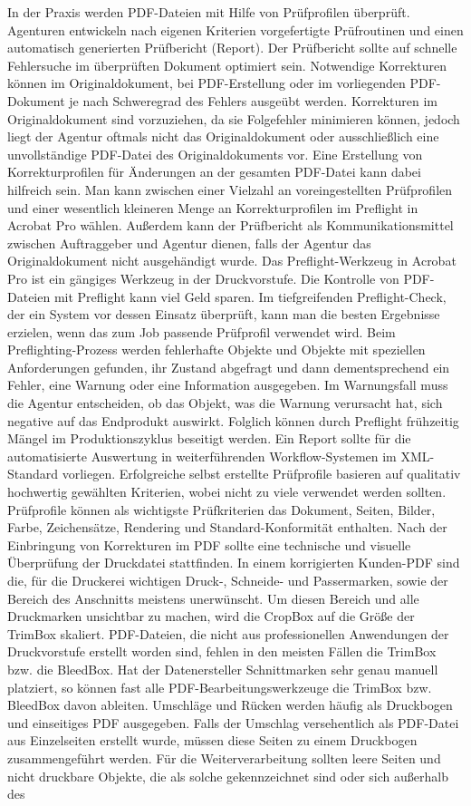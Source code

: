 In der Praxis werden PDF-Dateien mit Hilfe von Prüfprofilen überprüft. Agenturen entwickeln nach eigenen Kriterien vorgefertigte Prüfroutinen und einen automatisch generierten Prüfbericht (Report). Der Prüfbericht sollte auf schnelle Fehlersuche im überprüften Dokument optimiert sein. Notwendige Korrekturen können im Originaldokument, bei PDF-Erstellung oder im vorliegenden PDF-Dokument je nach Schweregrad des Fehlers ausgeübt werden. Korrekturen im Originaldokument sind vorzuziehen, da sie Folgefehler minimieren können, jedoch liegt der Agentur oftmals nicht das Originaldokument oder ausschließlich eine unvollständige PDF-Datei des Originaldokuments vor. Eine Erstellung von Korrekturprofilen für Änderungen an der gesamten PDF-Datei kann dabei hilfreich sein. Man kann zwischen einer Vielzahl an voreingestellten Prüfprofilen und einer wesentlich kleineren Menge an Korrekturprofilen im Preflight in Acrobat Pro wählen. Außerdem kann der Prüfbericht als Kommunikationsmittel zwischen Auftraggeber und Agentur dienen, falls der Agentur das Originaldokument nicht ausgehändigt wurde. Das Preflight-Werkzeug in Acrobat Pro ist ein gängiges Werkzeug in der Druckvorstufe. Die Kontrolle von PDF-Dateien mit Preflight kann viel Geld sparen. Im tiefgreifenden Preflight-Check, der ein System vor dessen Einsatz überprüft, kann man die besten Ergebnisse erzielen, wenn das zum Job passende Prüfprofil verwendet wird. Beim Preflighting-Prozess werden fehlerhafte Objekte und Objekte mit speziellen Anforderungen gefunden, ihr Zustand abgefragt und dann dementsprechend ein Fehler, eine Warnung oder eine Information ausgegeben. Im Warnungsfall muss die Agentur entscheiden, ob das Objekt, was die Warnung verursacht hat, sich negative auf das Endprodukt auswirkt. Folglich können durch Preflight frühzeitig Mängel im Produktionszyklus beseitigt werden. Ein Report sollte für die automatisierte Auswertung in weiterführenden Workflow-Systemen im XML-Standard vorliegen. Erfolgreiche selbst erstellte Prüfprofile basieren auf qualitativ hochwertig gewählten Kriterien, wobei nicht zu viele verwendet werden sollten. Prüfprofile können als wichtigste Prüfkriterien das Dokument, Seiten, Bilder, Farbe, Zeichensätze, Rendering und Standard-Konformität enthalten. Nach der Einbringung von Korrekturen im PDF sollte eine technische und visuelle Überprüfung der Druckdatei stattfinden. In einem korrigierten Kunden-PDF sind die, für die Druckerei wichtigen Druck-, Schneide- und Passermarken, sowie der Bereich des Anschnitts meistens unerwünscht. Um diesen Bereich und alle Druckmarken unsichtbar zu machen, wird die CropBox auf die Größe der TrimBox skaliert. PDF-Dateien, die nicht aus professionellen Anwendungen der Druckvorstufe erstellt worden sind, fehlen in den meisten Fällen die TrimBox bzw. die BleedBox. Hat der Datenersteller Schnittmarken sehr genau manuell platziert, so können fast alle PDF-Bearbeitungswerkzeuge die TrimBox bzw. BleedBox davon ableiten. Umschläge und Rücken werden häufig als Druckbogen und einseitiges PDF ausgegeben. Falls der Umschlag versehentlich als PDF-Datei aus Einzelseiten erstellt wurde, müssen diese Seiten zu einem Druckbogen zusammengeführt werden. Für die Weiterverarbeitung sollten leere Seiten und nicht druckbare Objekte, die als solche gekennzeichnet sind oder sich außerhalb des 
